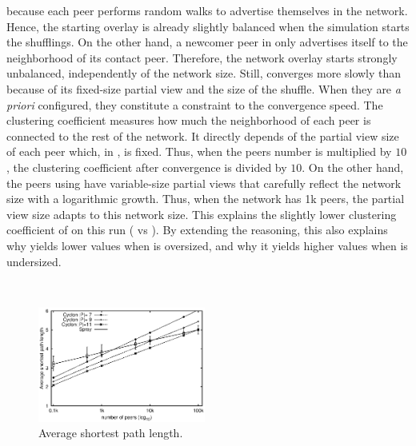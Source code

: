 \begin{asparadesc}
  because each peer performs random walks to advertise themselves in
  the network. Hence, the starting overlay is already slightly
  balanced when the simulation starts the shufflings. On the other
  hand, a newcomer peer in \SPRAY only advertises itself to the
  neighborhood of its contact peer. Therefore, the network overlay
  starts strongly unbalanced, independently of the network
  size. Still, \CYCLON converges more slowly than \SPRAY because of
  its fixed-size partial view and the size of the shuffle. When they
  are \emph{a priori} configured, they constitute a constraint to the
  convergence speed.  The clustering coefficient measures how much the
  neighborhood of each peer is connected to the rest of the
  network. It directly depends of the partial view size of each peer
  which, in \CYCLON, is fixed. Thus, when the peers number is
  multiplied by $10$, the clustering coefficient after convergence is
  divided by $10$. On the other hand, the peers using \SPRAY have
  variable-size partial views that carefully reflect the network size
  with a logarithmic growth. Thus, when the network has 1k peers, the
  partial view size adapts to this network size. This explains the
  slightly lower clustering coefficient of \SPRAY on this run ( vs ). By extending the reasoning, this also explains
  why \SPRAY yields lower values when \CYCLON is oversized, and why it
  yields higher values when \CYCLON is undersized.
\end{asparadesc}

\ \\

\begin{figure}
  \centering
  \includegraphics[width=0.49\textwidth]{img/avgpath.eps}
  \caption{\label{fig:avgpath}Average shortest path length.}
\end{figure}

